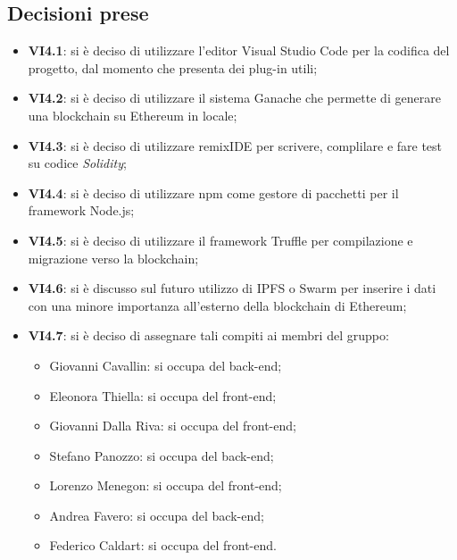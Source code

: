 	\subsection{Decisioni prese}
		\begin{itemize}
			\item \textbf{VI4.1}: si è deciso di utilizzare l'editor Visual Studio Code per la codifica del progetto, dal momento che presenta dei plug-in utili;
			\item \textbf{VI4.2}: si è deciso di utilizzare il sistema Ganache che permette di generare una blockchain su Ethereum in locale;
			\item \textbf{VI4.3}: si è deciso di utilizzare remixIDE per scrivere, complilare e fare test su codice \emph{Solidity};
			\item \textbf{VI4.4}: si è deciso di utilizzare npm come gestore di pacchetti per il framework Node.js;
			\item \textbf{VI4.5}: si è deciso di utilizzare il framework Truffle per compilazione e migrazione verso la blockchain;
			\item \textbf{VI4.6}: si è discusso sul futuro utilizzo di IPFS o Swarm per inserire i dati con una minore importanza all'esterno della blockchain di Ethereum;
			\item \textbf{VI4.7}: si è deciso di assegnare tali compiti ai membri del gruppo:
				\begin{itemize}
					\item Giovanni Cavallin: si occupa del back-end;
					\item Eleonora Thiella: si occupa del front-end;
					\item Giovanni Dalla Riva: si occupa del front-end;
					\item Stefano Panozzo: si occupa del back-end;
					\item Lorenzo Menegon: si occupa del front-end;
					\item Andrea Favero: si occupa del back-end;
					\item Federico Caldart: si occupa del front-end.
				\end{itemize}
		\end{itemize}

